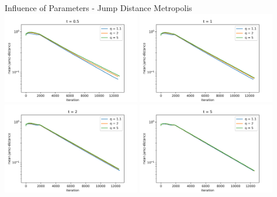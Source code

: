 \documentclass[]{beamer}
\begin{document}
  \begin{frame}{Influence of Parameters - Jump Distance Metropolis}
    \centering
    \includegraphics[trim={0.35cm, 0.1cm, 1.5cm, 0.5cm}, clip, width=0.45\textwidth]{figs/results/params/jump_distances_metropolis_t_05}
    \includegraphics[trim={0.35cm, 0.1cm, 1.5cm, 0.5cm}, clip, width=0.45\textwidth]{figs/results/params/jump_distances_metropolis_t_1}
    \includegraphics[trim={0.35cm, 0.1cm, 1.5cm, 0.5cm}, clip, width=0.45\textwidth]{figs/results/params/jump_distances_metropolis_t_2}
    \includegraphics[trim={0.35cm, 0.1cm, 1.5cm, 0.5cm}, clip, width=0.45\textwidth]{figs/results/params/jump_distances_metropolis_t_5}
  \end{frame}
\end{document}

